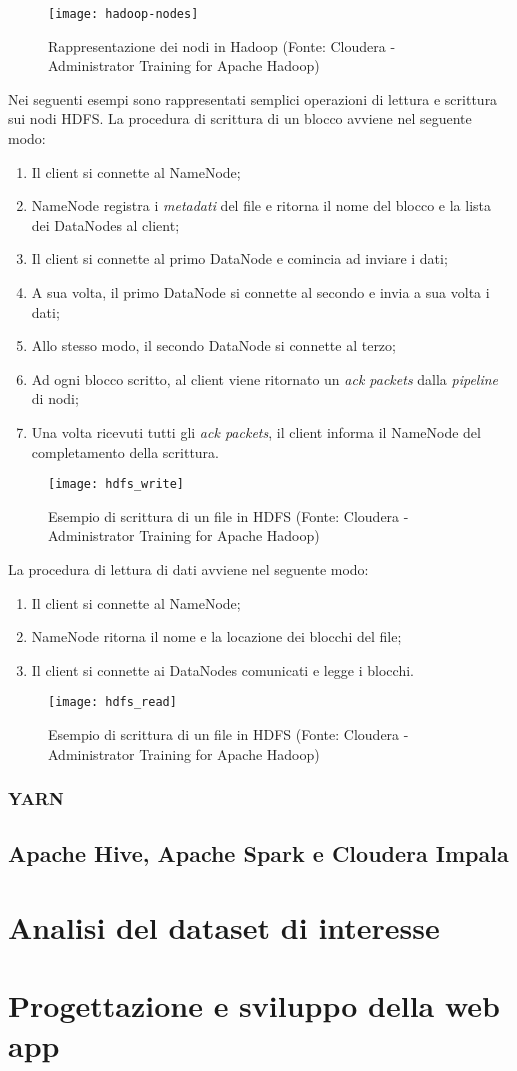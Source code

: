 \begin{figure}[!h]
	\centering
	\texttt{[image: hadoop-nodes]}
	\caption{Rappresentazione dei nodi in Hadoop (Fonte: Cloudera - Administrator Training for Apache Hadoop)}
\end{figure}
Nei seguenti esempi sono rappresentati semplici operazioni di lettura e scrittura sui nodi HDFS.
La procedura di scrittura di un blocco avviene nel seguente modo:
\begin{enumerate}
	\item Il client si connette al NameNode;
	\item NameNode registra i \textit{metadati} del file e ritorna il nome del blocco e la lista dei DataNodes al client;
	\item Il client si connette al primo DataNode e comincia ad inviare i dati;
	\item A sua volta, il primo DataNode si connette al secondo e invia a sua volta i dati;
	\item Allo stesso modo, il secondo DataNode si connette al terzo;
	\item Ad ogni blocco scritto, al client viene ritornato un \textit{ack packets} dalla \textit{pipeline} di nodi;
	\item Una volta ricevuti tutti gli \textit{ack packets}, il client informa il NameNode del completamento della scrittura.
\end{enumerate} 
\begin{figure}[!h]
	\centering
	\texttt{[image: hdfs\_write]}
	\caption{Esempio di scrittura di un file in HDFS (Fonte: Cloudera - Administrator Training for Apache Hadoop)}
\end{figure}
La procedura di lettura di dati avviene nel seguente modo:
\begin{enumerate}
	\item Il client si connette al NameNode;
	\item NameNode ritorna il nome e la locazione dei blocchi del file;
	\item Il client si connette ai DataNodes comunicati e legge i blocchi.
\end{enumerate}
\begin{figure}[!h]
	\centering
	\texttt{[image: hdfs\_read]}
	\caption{Esempio di scrittura di un file in HDFS (Fonte: Cloudera - Administrator Training for Apache Hadoop)}
\end{figure}

\subsubsection{YARN}


\subsection{Apache Hive, Apache Spark e Cloudera Impala}

\section{Analisi del dataset di interesse} \label{dataset}


\section{Progettazione e sviluppo della web app}
